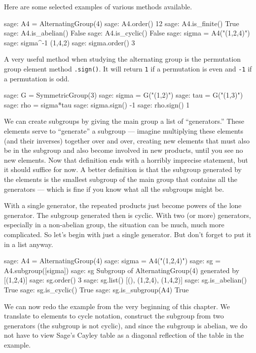 %
\begin{sageverbatim}
\end{sageverbatim}
%
Here are some selected examples of various methods available.
%
\begin{sageexample}
sage: A4 = AlternatingGroup(4)
sage: A4.order()
12
sage: A4.is_finite()
True
sage: A4.is_abelian()
False
sage: A4.is_cyclic()
False
sage: sigma = A4("(1,2,4)")
sage: sigma^-1
(1,4,2)
sage: sigma.order()
3
\end{sageexample}
%
A very useful method when studying the alternating group is the permutation group element method \verb?.sign()?.  It will return \verb?1? if a permutation is even and \verb?-1? if a permutation is odd.
%
\begin{sageexample}
sage: G = SymmetricGroup(3)
sage: sigma = G("(1,2)")
sage: tau = G("(1,3)")
sage: rho = sigma*tau
sage: sigma.sign()
-1
sage: rho.sign()
1
\end{sageexample}
%
We can create subgroups by giving the main group a list of ``generators.''  These elements serve to ``generate'' a subgroup --- imagine multiplying these elements (and their inverses) together over and over, creating new elements that must also be in the subgroup and also become involved in new products, until you see no new elements.  Now that definition ends with a horribly imprecise statement, but it should suffice for now.  A better definition is that the subgroup generated by the elements is the smallest subgroup of the main group that contains all the generators --- which is fine if you know what all the subgroups might be.\par
%
With a single generator, the repeated products just become powers of the lone generator.  The subgroup generated then is cyclic.  With two (or more) generators, especially in a non-abelian group, the situation can be much, much more complicated.  So let's begin with just a single generator.  But don't forget to put it in a list anyway.
%
\begin{sageexample}
sage: A4 = AlternatingGroup(4)
sage: sigma = A4("(1,2,4)")
sage: sg = A4.subgroup([sigma])
sage: sg
Subgroup of AlternatingGroup(4) generated by [(1,2,4)]
sage: sg.order()
3
sage: sg.list()
[(), (1,2,4), (1,4,2)]
sage: sg.is_abelian()
True
sage: sg.is_cyclic()
True
sage: sg.is_subgroup(A4)
True
\end{sageexample}
%
We can now redo the example from the very beginning of this chapter.  We translate to elements to cycle notation, construct the subgroup from two generators (the subgroup is not cyclic), and since the subgroup is abelian, we do not have to view Sage's Cayley table as a diagonal reflection of the table in the example.

